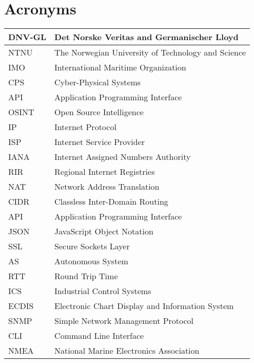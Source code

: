 \section{Acronyms} \label{app:acronyms}

\begin{table}[H]
\centering
\begin{tabular}{|l|l|}
\hline
    DNV-GL & Det Norske Veritas and Germanischer Lloyd\\ \hline
    NTNU & The Norwegian University of Technology and Science\\ \hline
    IMO & International Maritime Organization\\ \hline
    CPS & Cyber-Physical Systems\\ \hline
    API & Application Programming Interface\\ \hline
    OSINT & Open Source Intelligence \\ \hline
    IP & Internet Protocol \\ \hline
    ISP & Internet Service Provider \\ \hline
    IANA & Internet Assigned Numbers Authority \\ \hline
    RIR & Regional Internet Registries \\ \hline
    NAT & Network Address Translation \\ \hline
    CIDR & Classless Inter-Domain Routing\\ \hline
    API & Application Programming Interface \\ \hline
    JSON & JavaScript Object Notation \\ \hline
    SSL & Secure Sockets Layer \\ \hline
    AS & Autonomous System \\ \hline
    RTT & Round Trip Time \\ \hline
    ICS &  Industrial Control Systems \\ \hline
    ECDIS & Electronic Chart Display and Information System \\ \hline
    SNMP & Simple Network Management Protocol \\ \hline
    CLI & Command Line Interface \\ \hline
    NMEA & National Marine Electronics Association \\ \hline

\end{tabular}
\end{table}
